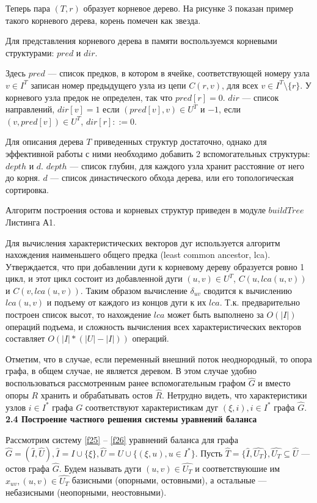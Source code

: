 \documentclass[14pt]{extarticle}%
\begin{document}
Теперь пара $(T,r)$ образует корневое дерево. На рисунке 3 показан пример такого корневого дерева, корень помечен как звезда.

Для представления корневого дерева в памяти воспользуемся корневыми структурами: $pred$ и $dir$. 

Здесь $pred$ --- список предков, в котором в ячейке, соответствующей номеру узла $v\in I^T$ записан номер предыдущего узла из цепи $C(r,v)$, для всех $v\in I^T\setminus \{r\}$. У корневого узла предок не определен, так что $pred[r]=0$. $dir$ --- список направлений, $dir[v]=1$ если $(pred[v],v)\in U^T$ и $-1$, если $(v,pred[v])\in U^T$, $dir[r]::=0$.

Для описания дерева $T$ приведенных структур достаточно, однако для эффективной работы с ними необходимо добавить 2 вспомогательных структуры: $depth$ и $d$. $depth$ --- список глубин, для каждого узла хранит расстояние от него до корня. $d$ --- список династического обхода дерева, или его топологическая сортировка.

Алгоритм построения остова и корневых структур приведен в модуле $buildTree$ Листинга А1.

Для вычисления характеристических векторов дуг используется алгоритм нахождения наименьшего общего предка (least common ancestor, lca). Утверждается, что при добавлении дуги к корневому дереву образуется ровно 1 цикл, и этот цикл состоит из добавленной дуги $(u,v)\in U^T$, $C(u,lca(u,v))$ и $C(v,lca(u,v))$. Таким образом вычисление $\delta_{uv}$ сводится к вычислению $lca(u,v)$ и подъему от каждого из концов дуги к их $lca$. Т.к. предварительно построен список высот, то нахождение $lca$ может быть выполнено за $O(|I|)$ операций подъема, и сложность вычисления всех характеристических векторов составляет $O(|I|*(|U|-|I|))$ операций.

Отметим, что в случае, если переменный внешний поток неоднородный, то опора графа, в общем случае, не является деревом. В этом случае удобно воспользоваться рассмотренным ранее вспомогательным графом $\widehat{G}$ и вместо опоры $R$ хранить и обрабатывать остов $\widehat{R}$. Нетрудно видеть, что характеристики узлов $i\in I^*$ графа $G$ соответствуют характеристикам дуг $(\xi,i), i\in I^*$ графа $\widehat{G}$.
\\

\textbf{2.4 Построение частного решения системы уравнений баланса}

Рассмотрим систему \eqref{f25} -- \eqref{f26} уравнений баланса для графа $\widehat{G}=(\widehat{I},\widehat{U}), \widehat{I}=I\cup\{\xi\}, \widehat{U}=U\cup\{(\xi,u),u\in I^*\}$. Пусть $\widehat{T}=\{\widehat{I},\widehat{U_T}\}, \widehat{U_T}\subseteq \widehat{U}$ --- остов графа $\widehat{G}$. Будем называть дуги $(u,v)\in \widehat{U_T}$ и соответствуюшие им $x_{uv}, (u,v)\in \widehat{U_T}$ базисными (опорными, остовными), а остальные --- небазисными (неопорными, неостовными).
\end{document}
